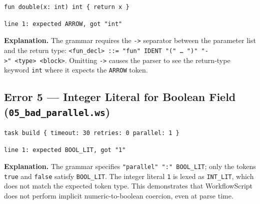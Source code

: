 \documentclass[10pt,a4paper]{article}
\begin{document}
\begin{lstlisting}[caption={04\_missing\_arrow.ws}]
fun double(x: int) int { return x }
\end{lstlisting}

\begin{lstlisting}[style=error]
line 1: expected ARROW, got "int"
\end{lstlisting}

\noindent\textbf{Explanation.}
The grammar requires the \texttt{->} separator between the parameter list and the
return type: \texttt{<fun\_decl>~::=~"fun"~IDENT~"("~\ldots~")"~"->"~<type>~<block>}.
Omitting \texttt{->} causes the parser to see the return-type keyword \texttt{int}
where it expects the \texttt{ARROW} token.

\subsection{Error 5 --- Integer Literal for Boolean Field (\texttt{05\_bad\_parallel.ws})}

\begin{lstlisting}[caption={05\_bad\_parallel.ws}]
task build { timeout: 30 retries: 0 parallel: 1 }
\end{lstlisting}

\begin{lstlisting}[style=error]
line 1: expected BOOL_LIT, got "1"
\end{lstlisting}

\noindent\textbf{Explanation.}
The grammar specifies \texttt{"parallel"~":"~BOOL\_LIT}; only the tokens \texttt{true}
and \texttt{false} satisfy \texttt{BOOL\_LIT}.  The integer literal \texttt{1} is
lexed as \texttt{INT\_LIT}, which does not match the expected token type.
This demonstrates that WorkflowScript does not perform implicit numeric-to-boolean
coercion, even at parse time.

\end{document}
